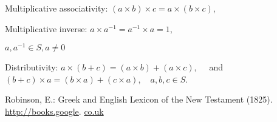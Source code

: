 Multiplicative associativity: $(a \times b) \times c=a \times(b \times c)$,

Multiplicative inverse: $a \times a^{-1}=a^{-1} \times a=1$,

$a, a^{-1} \in S, a \neq 0$

Distributivity: $a \times(b+c)=(a \times b)+(a \times c), \quad$ and $(b+c) \times a=(b \times a)+(c \times a), \quad a, b, c \in S$.


\begin{thebibliography}{99}
     Robinson, E.: Greek and English Lexicon of the New Testament (1825). \href{http://books.google}{http://books.google}. \href{http://co.uk}{co.uk}
\end{thebibliography}